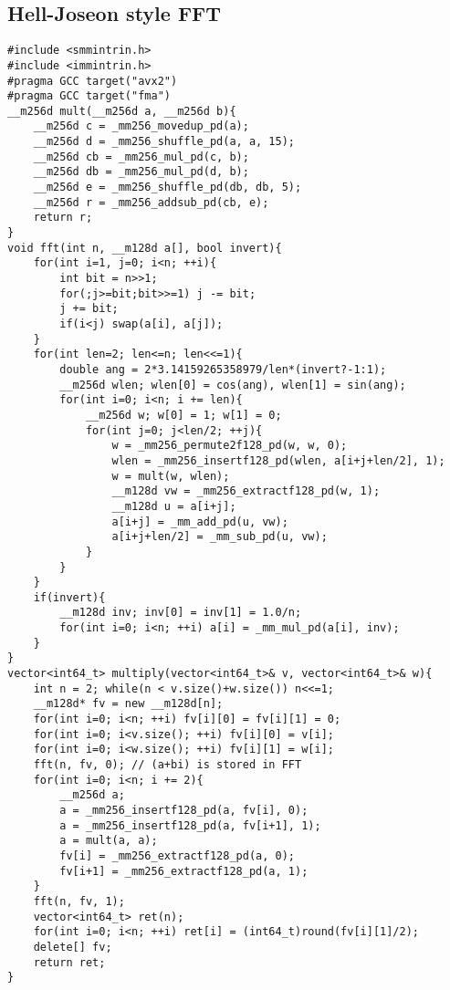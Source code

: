 \documentclass[landscape, 8pt, a4paper, oneside, twocolumn]{extarticle}
\begin{document}
\subsection{Hell-Joseon style FFT}
\begin{verbatim}
#include <smmintrin.h>
#include <immintrin.h>
#pragma GCC target("avx2")
#pragma GCC target("fma")
__m256d mult(__m256d a, __m256d b){
	__m256d c = _mm256_movedup_pd(a);
	__m256d d = _mm256_shuffle_pd(a, a, 15);
	__m256d cb = _mm256_mul_pd(c, b);
	__m256d db = _mm256_mul_pd(d, b);
	__m256d e = _mm256_shuffle_pd(db, db, 5);
	__m256d r = _mm256_addsub_pd(cb, e);
	return r;
}
void fft(int n, __m128d a[], bool invert){
	for(int i=1, j=0; i<n; ++i){
		int bit = n>>1;
		for(;j>=bit;bit>>=1) j -= bit;
		j += bit;
		if(i<j) swap(a[i], a[j]);
	}
	for(int len=2; len<=n; len<<=1){
		double ang = 2*3.14159265358979/len*(invert?-1:1);
		__m256d wlen; wlen[0] = cos(ang), wlen[1] = sin(ang);
		for(int i=0; i<n; i += len){
			__m256d w; w[0] = 1; w[1] = 0;
			for(int j=0; j<len/2; ++j){
				w = _mm256_permute2f128_pd(w, w, 0);
				wlen = _mm256_insertf128_pd(wlen, a[i+j+len/2], 1);
				w = mult(w, wlen);
				__m128d vw = _mm256_extractf128_pd(w, 1);
				__m128d u = a[i+j];
				a[i+j] = _mm_add_pd(u, vw);
				a[i+j+len/2] = _mm_sub_pd(u, vw);
			}
		}
	}
	if(invert){
		__m128d inv; inv[0] = inv[1] = 1.0/n;
		for(int i=0; i<n; ++i) a[i] = _mm_mul_pd(a[i], inv);
	}
}
vector<int64_t> multiply(vector<int64_t>& v, vector<int64_t>& w){
	int n = 2; while(n < v.size()+w.size()) n<<=1;
	__m128d* fv = new __m128d[n];
	for(int i=0; i<n; ++i) fv[i][0] = fv[i][1] = 0;
	for(int i=0; i<v.size(); ++i) fv[i][0] = v[i];
	for(int i=0; i<w.size(); ++i) fv[i][1] = w[i];
	fft(n, fv, 0); // (a+bi) is stored in FFT
	for(int i=0; i<n; i += 2){
		__m256d a;
		a = _mm256_insertf128_pd(a, fv[i], 0);
		a = _mm256_insertf128_pd(a, fv[i+1], 1);
		a = mult(a, a);
		fv[i] = _mm256_extractf128_pd(a, 0);
		fv[i+1] = _mm256_extractf128_pd(a, 1);
	}
	fft(n, fv, 1);
	vector<int64_t> ret(n);
	for(int i=0; i<n; ++i) ret[i] = (int64_t)round(fv[i][1]/2);
	delete[] fv;
	return ret;
}
\end{verbatim}
\end{document}
